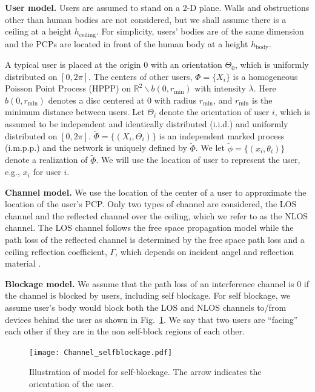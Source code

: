 \documentclass[10pt, conference, letterpaper]{IEEEtran}
\begin{document}
\textbf{User model.} Users are assumed to stand on a 2-D plane. 
Walls and obstructions other than human bodies are not considered, but we shall assume there is a ceiling at a height $h_{\mathrm{ceiling}}$. 
For simplicity, users' bodies are of the same dimension and the PCPs are located in front of the human body at a height $h_{\mathrm{body}}$. 


A typical user is placed at the origin 0 with an orientation $\Theta_0$, which is uniformly distributed on $[0, 2\pi]$. The centers of other users, $\Phi=\{X_i\}$ is a homogeneous Poisson Point Process (HPPP) on $\mathbb{R}^2\backslash {b}(0, r_{\min})$ with intensity $\lambda$. 
Here $b(0, r_{\min})$ denotes a disc centered at $0$ with radius $r_{\min}$, and $r_{\min}$ is the minimum distance between users.  
Let $\Theta_i$ denote the orientation of user $i$, which is assumed to be independent and identically distributed (i.i.d.) and uniformly distributed on $[0, 2\pi]$.
$\tilde{\Phi} = \{(X_i, \Theta_i)\}$ is an independent marked process (i.m.p.p.) and the network is uniquely defined by $\tilde{\Phi}$.
We let $\tilde{\phi} = \{(x_i, \theta_i)\}$ denote a realization of $\tilde{\Phi}$. 
We will use the location of user to represent the user, e.g., $x_i$ for user $i$. 


\textbf{Channel model.} We use the location of the center of a user to approximate the location of the user's PCP.
Only two types of channel are considered, the LOS channel and the reflected channel over the ceiling, which we refer to as the NLOS channel.
The LOS channel follows the free space propagation model while the path loss of the reflected channel is determined by the free space path loss and a ceiling reflection coefficient, $\Gamma$, which depends on incident angel and reflection material \cite{reflection}.


\textbf{Blockage model.} We assume that the path loss of an interference channel is 0 if the channel is blocked by users, including self blockage.
For self blockage, we assume user's body would block both the LOS and NLOS channels to/from devices behind the user as shown in Fig.~\ref{fig:channel:self-blockage}. 
We say that two users are ``facing'' each other if they are in the non self-block regions of each other.


\begin{figure}
	\centering
	\texttt{[image: Channel\_selfblockage.pdf]}
	\caption{Illustration of model for self-blockage. The arrow indicates the orientation of the user.}
	\label{fig:channel:self-blockage}
\end{figure}
\end{document}
